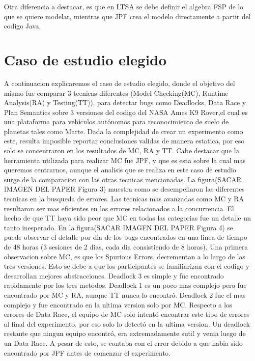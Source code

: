 \documentclass[runningheads]{llncs}
\begin{document}
Otra diferencia a destacar, es que en LTSA se debe definir el algebra FSP de lo que se quiere modelar, mientras que JPF crea el modelo directamente a partir del codigo Java.

\section{Caso de estudio elegido}

A continuacion explicaremos el caso de estudio elegido, donde el objetivo del mismo fue comparar 3 tecnicas diferentes (Model Checking(MC), Runtime Analysis(RA) y Testing(TT)), para detectar bugs como Deadlocks, Data Race y Plan Semantics sobre 3 versiones del codigo del NASA Ames K9 Rover,el cual es una plataforma para vehículos autónomos para reconocimiento de suelo de planetas tales como Marte.
Dada la complejidad de crear un experimento como este, resulta imposible reportar conclusiones validas de manera estatica, por eso solo se concentraron en los resultados de MC, RA y TT. Cabe destacar que la herramienta utilizada para realizar MC fue JPF, y que es esta sobre la cual mas queremos centrarnos, aunque el analisis que se realiza en este caso de estudio surge de la comparacion con las otras tecnicas mencionadas.
La figura(SACAR IMAGEN DEL PAPER  Figura 3) muestra como se desempeñaron las diferentes tecnicas en la busqueda de errores. Las tecnicas mas avanzadas como MC y RA resultaron ser mas eficientes en los errores relacionados a la concurrencia. El hecho de que TT haya sido peor que MC en todas las categorias fue un detalle un tanto inesperado.
En la figura(SACAR IMAGEN DEL PAPER  Figura 4) se puede observar el detalle por dia de los bugs encontrados en una linea de tiempo de 48 horas (3 sesiones de 2 dias, cada dia consistiendo de 8 horas). Una primera observacion sobre MC, es que los Spurious Errors, decrementan a lo largo de las tres versiones. Esto se debe a que los participantes se familiarizan con el codigo y desarrollan mejores abstracciones. Deadlock 3 es simple y fue encontrado rapidamente por los tres metodos. Deadlock 1 es un poco mas complejo pero fue encontrado por MC y RA, aunque TT nunca lo encontró. Deadlock 2 fue el mas complejo y fue encontrado en la ultima version solo por MC. Respecto a los errores de Data Race, el equipo de MC solo intentó encontrar este tipo de errores al final del experimento, por eso solo lo detectó en la ultima version. Un deadlock restante que ningun equipo encontró, era extremadamente sutil y venia luego de un Data Race. A pesar de esto, se contaba con el error debido a que habia sido encontrado por JPF antes de comenzar el experimento.
\end{document}
